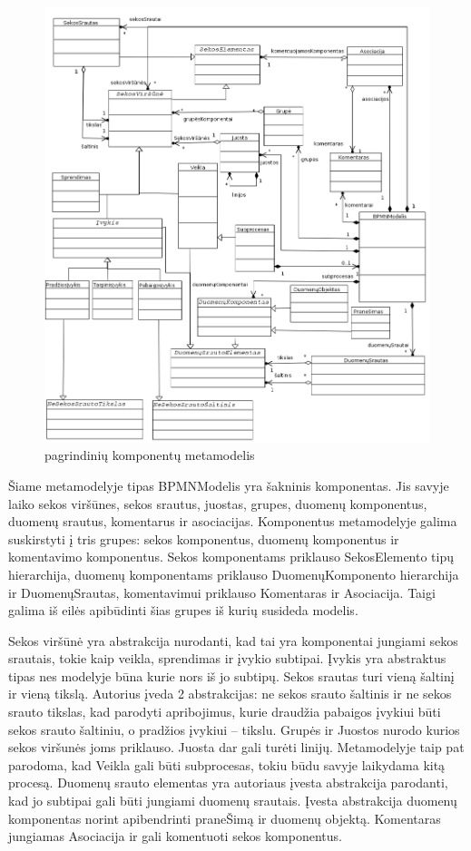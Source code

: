 \begin{figure}[H]
	\centering
	\includegraphics[width=\textwidth]{sections/modeling_methods_and_languages/img/bpmn_metamodel}
	\caption{\BPMN{} pagrindinių komponentų metamodelis}
	\label{img:bpmn_metamodel}
\end{figure}

Šiame metamodelyje tipas BPMNModelis yra šakninis komponentas. Jis savyje laiko
sekos viršūnes, sekos srautus, juostas, grupes, duomenų komponentus, duomenų
srautus, komentarus ir asociacijas. Komponentus metamodelyje galima suskirstyti
į tris grupes: sekos komponentus, duomenų komponentus ir komentavimo komponentus.
Sekos komponentams priklauso SekosElemento tipų hierarchija, duomenų
komponentams priklauso DuomenųKomponento hierarchija ir DuomenųSrautas,
komentavimui priklauso Komentaras ir Asociacija. Taigi galima iš eilės
apibūdinti šias grupes iš kurių susideda \BPMN{} modelis.

Sekos viršūnė yra abstrakcija nurodanti, kad tai yra komponentai jungiami
sekos srautais, tokie kaip veikla, sprendimas ir įvykio subtipai. Įvykis yra
abstraktus tipas nes modelyje būna kurie nors iš jo subtipų. Sekos srautas turi
vieną šaltinį ir vieną tikslą. Autorius įveda 2 abstrakcijas: ne sekos srauto
šaltinis ir ne sekos srauto tikslas, kad parodyti \BPMN{} apribojimus, kurie
draudžia pabaigos įvykiui būti sekos srauto šaltiniu, o pradžios įvykiui –
tikslu.  Grupės ir Juostos nurodo kurios sekos viršunės joms priklauso.
Juosta dar gali turėti linijų. Metamodelyje taip pat parodoma, kad Veikla gali
būti subprocesas, tokiu būdu savyje laikydama kitą procesą. Duomenų srauto
elementas yra autoriaus įvesta abstrakcija parodanti, kad jo subtipai gali
būti jungiami duomenų srautais. Įvesta abstrakcija duomenų komponentas norint
apibendrinti praneŠimą ir duomenų objektą. Komentaras jungiamas Asociacija ir
gali komentuoti sekos komponentus.
